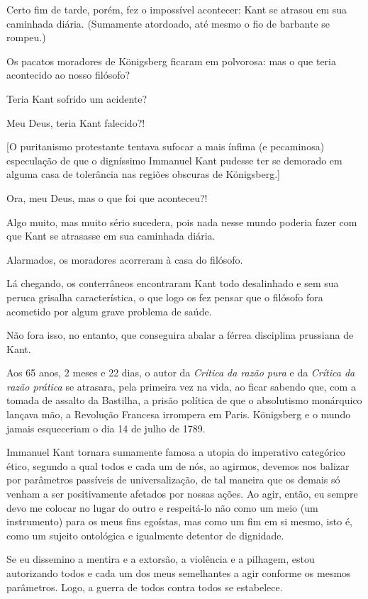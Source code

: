 Certo fim de tarde, porém, fez o impossível acontecer: Kant se atrasou
em sua caminhada diária. (Sumamente atordoado, até mesmo o fio de
barbante se rompeu.)

Os pacatos moradores de Königsberg ficaram em polvorosa: mas o que teria
acontecido ao nosso filósofo?

Teria Kant sofrido um acidente?

Meu Deus, teria Kant falecido?!

{[}O puritanismo protestante tentava sufocar a mais ínfima (e
pecaminosa) especulação de que o digníssimo Immanuel Kant pudesse ter se
demorado em alguma casa de tolerância nas regiões obscuras de
Königsberg.{]}

Ora, meu Deus, mas o que foi que aconteceu?!

Algo muito, mas muito sério sucedera, pois nada nesse mundo poderia
fazer com que Kant se atrasasse em sua caminhada diária.

Alarmados, os moradores acorreram à casa do filósofo.

Lá chegando, os conterrâneos encontraram Kant todo desalinhado e sem sua
peruca grisalha característica, o que logo os fez pensar que o filósofo
fora acometido por algum grave problema de saúde.

Não fora isso, no entanto, que conseguira abalar a férrea disciplina
prussiana de Kant.

Aos 65 anos, 2 meses e 22 dias, o autor da \emph{Crítica da razão pura}
e da \emph{Crítica da razão prática} se atrasara, pela primeira vez na
vida, ao ficar sabendo que, com a tomada de assalto da Bastilha, a
prisão política de que o absolutismo monárquico lançava mão, a Revolução
Francesa irrompera em Paris. Königsberg e o mundo jamais esqueceriam o
dia 14 de julho de 1789.

Immanuel Kant tornara sumamente famosa a utopia do imperativo categórico
ético, segundo a qual todos e cada um de nós, ao agirmos, devemos nos
balizar por parâmetros passíveis de universalização, de tal maneira que
os demais só venham a ser positivamente afetados por nossas ações. Ao
agir, então, eu sempre devo me colocar no lugar do outro e respeitá-lo
não como um meio (um instrumento) para os meus fins egoístas, mas como
um fim em si mesmo, isto é, como um sujeito ontológica e igualmente
detentor de dignidade.

Se eu dissemino a mentira e a extorsão, a violência e a pilhagem, estou
autorizando todos e cada um dos meus semelhantes a agir conforme os
mesmos parâmetros. Logo, a guerra de todos contra todos se estabelece.

